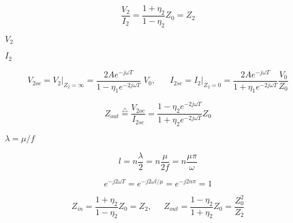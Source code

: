 {\newpage\clearpage
{}%
\begin{displaymath} \frac{V_2}{I_2}=\frac{1+\eta_2}{1-\eta_2}Z_0=Z_2 \end{displaymath}%
\lthtmldisplayZ
\lthtmlcheckvsize\clearpage}

{\newpage\clearpage
{}%
$V_2$%
\lthtmlinlinemathZ
\lthtmlcheckvsize\clearpage}

{\newpage\clearpage
{}%
$I_2$%
\lthtmlinlinemathZ
\lthtmlcheckvsize\clearpage}

{\newpage\clearpage
{}%
\begin{displaymath} V_{2oc}=V_2\big|_{Z_2=\infty}=\frac{2Ae^{-j\omega T}}{1-\eta_1e^{-2j\omega T}}\;V_0,\;\;\;\;\;\;
   I_{2sc}=I_2\big|_{Z_2=0}=\frac{2Ae^{-j\omega T}}{1+\eta_1e^{-2j\omega T}}\frac{V_0}{Z_0}
\end{displaymath}%
\lthtmldisplayZ
\lthtmlcheckvsize\clearpage}

{\newpage\clearpage
{}%
\begin{displaymath} Z_{out}\stackrel{\triangle}{=}\frac{V_{2oc}}{I_{2sc}}
=\frac{1-\eta_2e^{-2j\omega T}}{1+\eta_2e^{-2j\omega T}} Z_0 \end{displaymath}%
\lthtmldisplayZ
\lthtmlcheckvsize\clearpage}

{\newpage\clearpage
{}%
$\lambda=\mu/f$%
\lthtmlinlinemathZ
\lthtmlcheckvsize\clearpage}

{\newpage\clearpage
{}%
\begin{displaymath} l=n\frac{\lambda}{2}=n\frac{\mu}{2f}=n\frac{\mu\pi}{\omega}  \end{displaymath}%
\lthtmldisplayZ
\lthtmlcheckvsize\clearpage}

{\newpage\clearpage
{}%
\begin{displaymath} e^{-j2\omega T}=e^{-j2\omega l/\mu}=e^{-j2n\pi}=1 \end{displaymath}%
\lthtmldisplayZ
\lthtmlcheckvsize\clearpage}

{\newpage\clearpage
{}%
\begin{displaymath} Z_{in}=\frac{1+\eta_2}{1-\eta_2}Z_0=Z_2,\;\;\;\;\;
  Z_{out}=\frac{1-\eta_2}{1+\eta_2}Z_0=\frac{Z_0^2}{Z_2} \end{displaymath}%
\lthtmldisplayZ
\lthtmlcheckvsize\clearpage}

